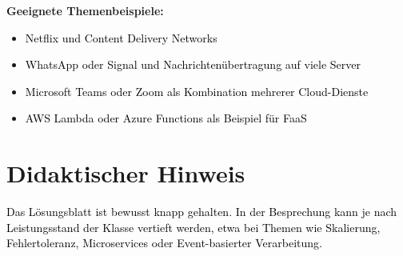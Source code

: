 \documentclass[11pt,a4paper]{article}
\newcommand{\solution}[1]{\textcolor{black}{#1}}
\begin{document}
\textbf{Geeignete Themenbeispiele:}
\begin{itemize}
  \item \solution{Netflix und Content Delivery Networks}
  \item \solution{WhatsApp oder Signal und Nachrichten\"ubertragung auf viele Server}
  \item \solution{Microsoft Teams oder Zoom als Kombination mehrerer Cloud-Dienste}
  \item \solution{AWS Lambda oder Azure Functions als Beispiel f\"ur FaaS}
\end{itemize}

\section*{Didaktischer Hinweis}
\solution{Das L\"osungsblatt ist bewusst knapp gehalten. In der Besprechung kann je nach Leistungsstand der Klasse vertieft werden, etwa bei Themen wie Skalierung, Fehlertoleranz, Microservices oder Event-basierter Verarbeitung.}
\end{document}
